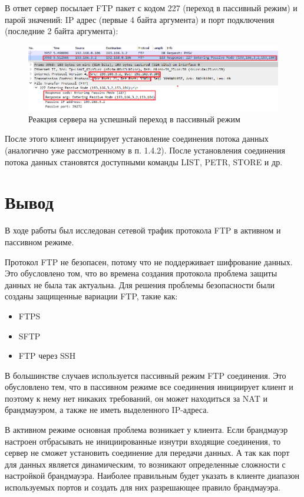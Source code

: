 \documentclass[14pt,a4paper,report]{report}
\begin{document}
В ответ сервер посылает FTP пакет с кодом 227 (переход в пассивный режим) и парой значений: IP адрес (первые 4 байта аргумента) и порт подключения (последние 2 байта аргумента): 

\begin{figure}[h!]
	\centering
	\includegraphics[scale = 0.73]{images/ftp9.png}
	
	\caption{Реакция сервера на успешный переход в пассивный режим}
	\label{image:12}
\end{figure}

После этого клиент инициирует установление соединения потока данных (аналогично уже рассмотренному в п. 1.4.2). После установления соединения потока данных становятся доступными команды LIST, PETR, STORE и др.

\section{Вывод}

В ходе работы был исследован сетевой трафик протокола FTP в активном и пассивном режиме.

Протокол FTP не безопасен, потому что не поддерживает шифрование данных. Это обусловлено том, что во времена создания протокола проблема защиты данных не была так актуальна. Для решения проблемы безопасности были созданы защищенные вариации FTP, такие как:

\begin{itemize}
	\item FTPS
	\item SFTP
	\item FTP через SSH
\end{itemize}
	
В большинстве случаев используется пассивный режим FTP соединения. Это обусловлено тем, что в пассивном режиме все соединения инициирует клиент и поэтому к нему нет никаких требований, он может находиться за NAT и брандмауэром, а также не иметь выделенного IP-адреса.

В активном режиме основная проблема возникает у клиента. Если брандмауэр настроен отбрасывать не инициированные изнутри входящие соединения, то сервер не сможет установить соединение для передачи данных. А так как порт для данных является динамическим, то возникают определенные сложности с настройкой брандмауэра. Наиболее правильным будет указать в клиенте диапазон используемых портов и создать для них разрешающее правило брандмауэра.
\end{document}
